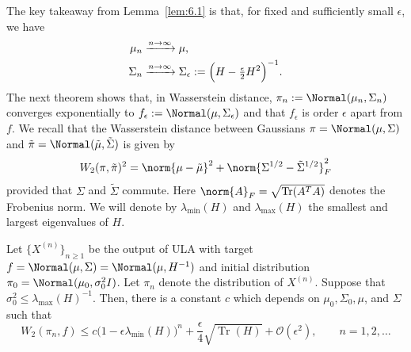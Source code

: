 The key takeaway from Lemma~\ref{lem:6.1} is that, for fixed and sufficiently small $\epsilon$,
we have
\begin{align*}
  \mu_n &\xrightarrow{n\to\infty} \mu, \\
  \Sigma_n &\xrightarrow{n\to\infty} \Sigma_\epsilon
    := \Bigl(H - \tfrac{\epsilon}{2}H^2\Bigr)^{-1}.
\end{align*}
The next theorem shows that, in Wasserstein distance, $\pi_n := \Normal(\mu_n, \Sigma_n)$
converges exponentially to $f_\epsilon := \Normal(\mu, \Sigma_\epsilon)$ and that $f_\epsilon$
is order $\epsilon$ apart from $f$. We recall that the Wasserstein distance between Gaussians
$\pi = \Normal(\mu,\Sigma)$ and $\tilde\pi = \Normal(\tilde\mu, \tilde\Sigma)$ is given by
\[
  W_2(\pi, \tilde\pi)^2 = \norm{\mu - \tilde\mu}^2 + \norm{\Sigma^{1/2} - \tilde\Sigma^{1/2}}_F^2
\]
provided that $\Sigma$ and $\tilde\Sigma$ commute. Here $\norm{A}_F = \sqrt{\operatorname{Tr}(A^T A)}$
denotes the Frobenius norm. We will denote by $\lambda_{\min}(H)$ and $\lambda_{\max}(H)$ the
smallest and largest eigenvalues of $H$.

\begin{theorem}
\label{thm:6.2}
Let $\{X^{(n)}\}_{n\ge 1}$ be the output of ULA with target $f = \Normal(\mu,\Sigma) =
\Normal(\mu, H^{-1})$ and initial distribution $\pi_0 = \Normal(\mu_0, \sigma_0^2 I)$.
Let $\pi_n$ denote the distribution of $X^{(n)}$.
Suppose that $\sigma_0^2 \le \lambda_{\max}(H)^{-1}$.
Then, there is a constant $c$ which depends on $\mu_0, \Sigma_0, \mu$, and $\Sigma$ such that
\[
  W_2(\pi_n, f) \le c\bigl(1 - \epsilon\lambda_{\min}(H)\bigr)^n
  + \frac{\epsilon}{4}\sqrt{\operatorname{Tr}(H)} + \mathcal{O}(\epsilon^2),
  \qquad n = 1, 2, \ldots
\]
\end{theorem}

